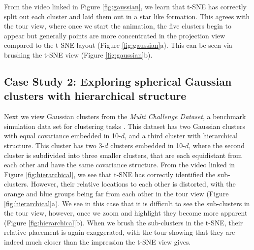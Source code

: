 \documentclass[article,notitle]{jdssv}
\begin{document}
From the video linked in Figure \ref{fig:gaussian}, we learn that t-SNE has
correctly split out each cluster and laid them out in a star like formation.
This agrees with the tour view,
where once we start the animation, the five clusters begin to appear but
generally points are more concentrated in the projection view compared to
the t-SNE layout (Figure \ref{fig:gaussian}a).
This can be seen via brushing the t-SNE view (Figure \ref{fig:gaussian}b).

\hypertarget{case-study-2-exploring-spherical-gaussian-clusters-with-hierarchical-structure}{%
\subsection{Case Study 2: Exploring spherical Gaussian clusters with hierarchical structure}\label{case-study-2-exploring-spherical-gaussian-clusters-with-hierarchical-structure}}

Next we view Gaussian clusters from the
\emph{Multi Challenge Dataset}, a benchmark simulation data set for clustering tasks
\citep{Rauber2009-vh}. This dataset has two Gaussian clusters with equal covariance
embedded in 10-\(d\), and a third cluster
with hierarchical structure. This cluster has two 3-\(d\) clusters embedded in
10-\(d\), where the second cluster is subdivided into three smaller clusters,
that are each equidistant from each other and have the same covariance structure.
From the video linked in Figure \ref{fig:hierarchical}, we see
that t-SNE has correctly identified the sub-clusters. However, their relative
locations to each other is distorted, with the orange and blue groups being
far from each other in the tour view (Figure \ref{fig:hierarchical}a). We see
in this case that it is difficult
to see the sub-clusters in the tour view, however, once we zoom and highlight
they become more apparent (Figure \ref{fig:hierarchical}b). When we brush
the sub-clusters in the t-SNE, their
relative placement is again exaggerated, with the tour showing that they
are indeed much closer than the impression the t-SNE view gives.
\end{document}
